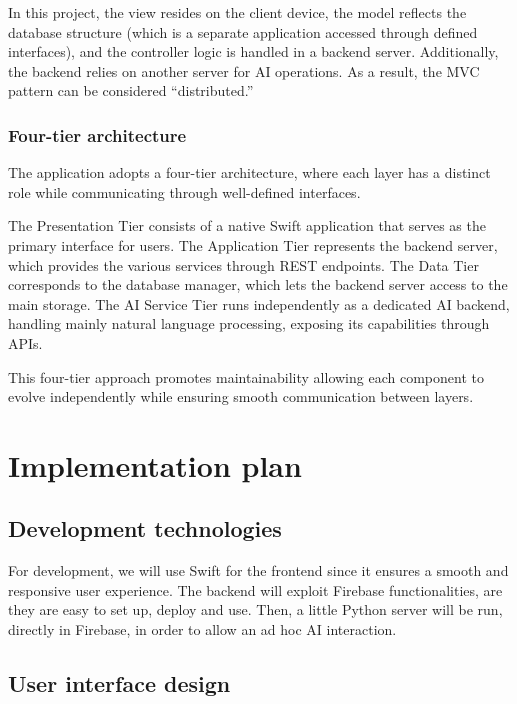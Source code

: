 \documentclass{article}
\begin{document}
In this project, the view resides on the client device, the model reflects the database structure (which is a separate application accessed through defined interfaces), and the controller logic is handled in a backend server.
Additionally, the backend relies on another server for AI operations.
As a result, the MVC pattern can be considered “distributed.”

\subsubsection{Four-tier architecture}

The application adopts a four-tier architecture, where each layer has a distinct role while communicating through well-defined interfaces.

The Presentation Tier consists of a native Swift application that serves as the primary interface for users.
The Application Tier represents the backend server, which provides the various services through REST endpoints.
The Data Tier corresponds to the database manager, which lets the backend server access to the main storage.
The AI Service Tier runs independently as a dedicated AI backend, handling mainly natural language processing, exposing its capabilities through APIs.

This four-tier approach promotes maintainability allowing each component to evolve independently while ensuring smooth communication between layers.

\newpage
\section{Implementation plan}

\subsection{Development technologies}

For development, we will use Swift for the frontend since it ensures a smooth and responsive user experience.
The backend will exploit Firebase functionalities, are they are easy to set up, deploy and use.
Then, a little Python server will be run, directly in Firebase, in order to allow an ad hoc AI interaction.

\subsection{User interface design}
\end{document}
